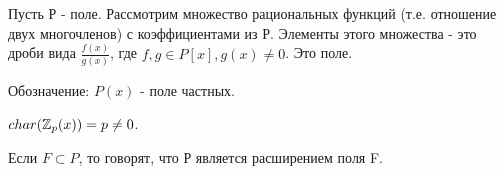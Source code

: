 \documentclass[../main.tex]{subfiles}
\begin{document}
    \void{} Пусть Р - поле. Рассмотрим множество рациональных функций
    (т.е. отношение двух многочленов) с коэффициентами из Р. Элементы этого множества
    - это дроби вида $\frac{f(x)}{g(x)}$, где $f,g\in P[x], g(x)\neq 0$. Это поле.

    Обозначение: $P(x)$ - поле частных.

    \void{} $char(\mathbb{Z}_p(x)) = p\neq 0$.

    \void{} Если $F\subset P$, то говорят, что Р является расширением поля F.
\end{document}
